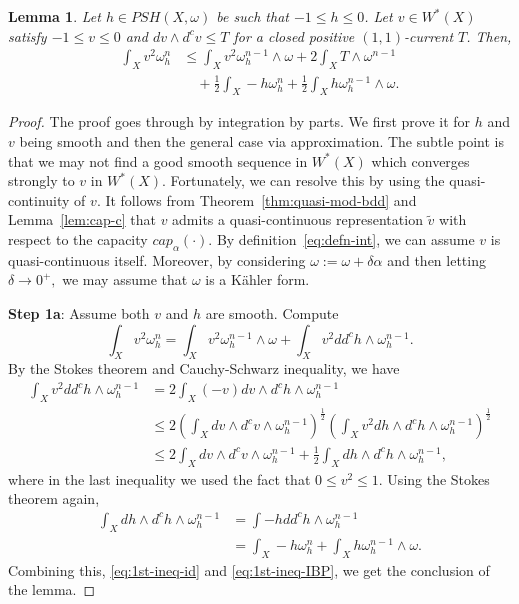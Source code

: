 \documentclass{amsart}
\newcommand{\wt}[1]{\widetilde{#1}}
\newcommand{\al}{\alpha}
\newcommand{\de}{\delta}
\newcommand{\om}{\omega}
\newtheorem{lem}[thm]{Lemma}
\theoremstyle{definition}
\numberwithin{thm}{section}
\numberwithin{equation}{section}
\renewcommand{\[}{\begin{equation}}
\renewcommand{\]}{\end{equation}}
\newcommand{\wed}{\wedge}
\begin{document}
\begin{lem} \label{lem:IBP-ineq}Let $h \in PSH(X,\om)$ be such that $-1 \leq h \leq 0$. Let $v \in W^*(X)$ satisfy  $-1\leq v \leq 0$ and $dv \wed d^c v \leq T$ for a closed positive $(1,1)$-current $T$. Then, 
$$
\begin{aligned}
	\int_X v^2 \om_h^n 
&\leq 	\int_X v^2 \om_h^{n-1}\wed \om 
+ 2 \int_X T \wed\om^{n-1} \\ 
&\quad 	+ \frac{1}{2} \int_X -h \om_h^n + \frac{1}{2} \int_X h\om_h^{n-1}\wed \om.
\end{aligned}$$
\end{lem}


\begin{proof}  The proof goes through  by integration by parts.  We first prove it for  $h$ and $v$ being smooth and then the general case via approximation. The subtle point is that we may not find a good smooth sequence in $W^*(X)$ which converges strongly to $v$ in $W^*(X)$. Fortunately, we can resolve this by using the quasi-continuity of $v$.   It follows from Theorem~\ref{thm:quasi-mod-bdd}  and Lemma~\ref{lem:cap-c} that $v$ admits a quasi-continuous representation $\wt v$ with respect to the capacity $cap_\al(\cdot)$. By definition~\eqref{eq:defn-int}, we can assume $v$ is quasi-continuous itself. Moreover, by considering $\om:=\om + \de \al$ and then letting $\de \to 0^+,$ we may assume that $\om$ is a K\"ahler form. 

{\bf Step 1a}: Assume both $v$ and $h$ are smooth. Compute
\[\label{eq:1st-ineq-id}
	\int_X v^2 \om_h^n = \int_X v^2 \om_h^{n-1} \wed\om + \int_X v^2 dd^c h \wed \om_h^{n-1}.
\]
By the Stokes theorem and Cauchy-Schwarz inequality, we have
\[\label{eq:1st-ineq-IBP}\begin{aligned}
	\int_X v^2 dd^c h \wed \om_h^{n-1} 
&= 2\int_X (-v) dv\wed d^c h \wed \om^{n-1}_h \\
&\leq 2 \left( \int_X dv \wed d^c v \wed \om_h^{n-1}\right)^\frac{1}{2} \left( \int_X v^2dh \wed d^c h \wed \om_h^{n-1}\right)^\frac{1}{2} \\
&\leq 2 \int_X dv \wed d^c v\wed \om_h^{n-1} + \frac{1}{2} \int_X d h \wed d^c h \wed \om_h^{n-1},
\end{aligned}\]
where in the last inequality we  used the fact that $0\leq v^2 \leq 1$.
Using the Stokes theorem again,
$$\begin{aligned}
	\int_X dh \wed d^c h \wed \om_h^{n-1} 
&= \int - h dd^c h\wed\om_h^{n-1} \\
&= \int_X -h \om_h^n + \int_X h \om_h^{n-1} \wed \om.
\end{aligned}$$
Combining this, \eqref{eq:1st-ineq-id} and \eqref{eq:1st-ineq-IBP}, we get the conclusion of the lemma.


\end{proof}
\end{document}
